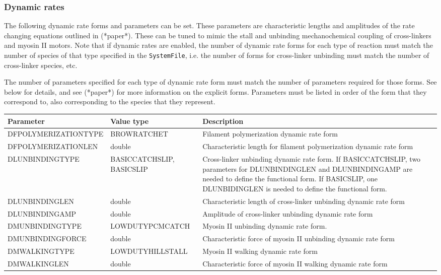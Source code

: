 \documentclass[11pt, oneside]{article}   	%
\begin{document}
\subsubsection{Dynamic rates}

The following dynamic rate forms and parameters can be set. These parameters are characteristic lengths and amplitudes of the rate changing equations outlined in (*paper*). These can be tuned to mimic the stall and unbinding mechanochemical coupling of cross-linkers and myosin II motors. Note that if dynamic rates are enabled, the number of dynamic rate forms for each type of reaction must match the number of species of that type specified in the \texttt{SystemFile}, i.e. the number of forms for cross-linker unbinding must match the number of cross-linker species, etc.

The number of parameters specified for each type of dynamic rate form must match the number of parameters required for those forms. See below for details, and see (*paper*) for more information on the explicit forms. Parameters must be listed in order of the form that they correspond to, also corresponding to the species that they represent.

\begin{longtable}{|L{5.5cm}|C{3.2cm}|L{6cm}|}  
\hline
 \textbf{Parameter} & \textbf{Value type} & \textbf{Description} \\
 \hline
 DFPOLYMERIZATIONTYPE & BROWRATCHET & Filament polymerization dynamic rate form \\
 \hline
  DFPOLYMERIZATIONLEN & double & Characteristic length for filament polymerization dynamic rate form \\
  \hline
  DLUNBINDINGTYPE & BASICCATCHSLIP, BASICSLIP & Cross-linker unbinding dynamic rate form. 
  If BASICCATCHSLIP, two
  parameters for DLUNBINDINGLEN and DLUNBINDINGAMP are needed to define the functional form. 
  If BASICSLIP, one 
  DLUNBIDINGLEN is needed to define the functional form. \\
  \hline
  DLUNBINDINGLEN & double & Characteristic length of cross-linker unbinding dynamic rate form \\
  \hline
   DLUNBINDINGAMP & double & Amplitude of cross-linker unbinding dynamic rate form \\
  \hline
    DMUNBINDINGTYPE & LOWDUTYPCMCATCH & Myosin II unbinding dynamic rate form. \\
  \hline
  DMUNBINDINGFORCE & double & Characteristic force of myosin II unbinding dynamic rate form \\
  \hline
  DMWALKINGTYPE & LOWDUTYHILLSTALL & Myosin II walking dynamic rate form \\ 
  \hline
  DMWALKINGLEN & double & Characteristic force of myosin II walking dynamic rate form \\
  \hline
 
\end{longtable}
\end{document}

